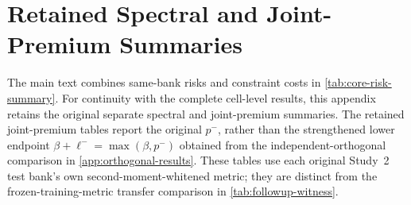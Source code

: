\section{Retained Spectral and Joint-Premium Summaries}
\label{app:retained-summaries}
The main text combines same-bank risks and constraint costs in \cref{tab:core-risk-summary}. For continuity with the complete cell-level results, this appendix retains the original separate spectral and joint-premium summaries. The retained joint-premium tables report the original $p^-$, rather than the strengthened lower endpoint $\beta+\ell^-=\max(\beta,p^-)$ obtained from the independent-orthogonal comparison in \cref{app:orthogonal-results}. These tables use each original Study~2 test bank's own second-moment-whitened metric; they are distinct from the frozen-training-metric transfer comparison in \cref{tab:followup-witness}.



\begin{table}[H]
\caption{Same-metric reference and class-risk premium at $r=16$ on the original Study~2 test bank. Each domain averages \BoundedCellsPerDomain{} fixed cells equally. $p^-=\max\{0,2(1-\gamma_r)-\eta\}$ and $p^+=2(1-\gamma_r^2)-\eta$ are computed per cell before averaging. They bound the mean cost of imposing exact laws and orthogonality jointly. $L(I)$ uses total trivial energy and was also checked by direct residuals on the saved coordinates. These are finite-bank quantities, not transfer losses or confidence limits.}
\label{tab:bounded-risk}
\centering\small

\end{table}
